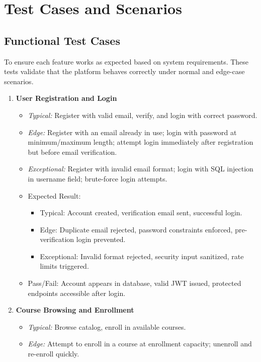 \documentclass[a4paper,11pt]{scrartcl}
\begin{document}
\section{Test Cases and Scenarios}

\subsection{Functional Test Cases}
To ensure each feature works as expected based on system requirements. These tests validate that the platform behaves correctly under normal and edge-case scenarios.

\begin{enumerate}[leftmargin=*]
    \item \textbf{User Registration and Login}
        \begin{itemize}
            \item \emph{Typical:} Register with valid email, verify, and login with correct password.
            \item \emph{Edge:} Register with an email already in use; login with password at minimum/maximum length; attempt login immediately after registration but before email verification.
            \item \emph{Exceptional:} Register with invalid email format; login with SQL injection in username field; brute-force login attempts.
            \item Expected Result: 
                \begin{itemize}
                  \item Typical: Account created, verification email sent, successful login.
                  \item Edge: Duplicate email rejected, password constraints enforced, pre-verification login prevented.
                  \item Exceptional: Invalid format rejected, security input sanitized, rate limits triggered.
                \end{itemize}
            \item Pass/Fail: Account appears in database, valid JWT issued, protected endpoints accessible after login.
        \end{itemize}
    \item \textbf{Course Browsing and Enrollment}
        \begin{itemize}
            \item \emph{Typical:} Browse catalog, enroll in available courses.
            \item \emph{Edge:} Attempt to enroll in a course at enrollment capacity; unenroll and re-enroll quickly.

\end{itemize}
\end{enumerate}
\end{document}
